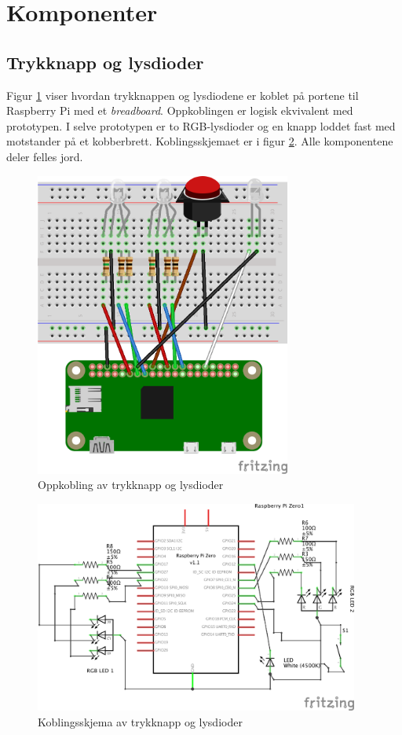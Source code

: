 \section{Komponenter}

\subsection{Trykknapp og lysdioder}
Figur \ref{fig:breadboard} viser hvordan trykknappen og lysdiodene er koblet på
portene til Raspberry Pi med et \textit{breadboard}. Oppkoblingen er logisk ekvivalent med prototypen.
I selve prototypen er to RGB-lysdioder og en knapp loddet fast med motstander på et kobberbrett. %
Koblingsskjemaet er i figur \ref{fig:schematics}. Alle komponentene deler felles jord.

\begin{figure}
\includegraphics[width=0.75\textwidth, center]{fig/prototype/breadbord}
\caption{Oppkobling av trykknapp og lysdioder}
\label{fig:breadboard}
\end{figure}

\begin{figure}
\includegraphics[width=0.95\textwidth, center]{fig/prototype/schmeatic}
\caption{Koblingsskjema av trykknapp og lysdioder}
\label{fig:schematics}
\end{figure}

